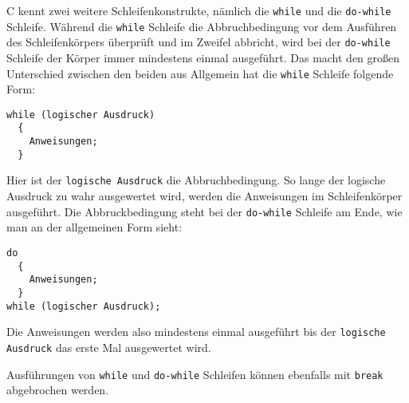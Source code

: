 C kennt zwei weitere Schleifenkonstrukte, nämlich die \verb|while| und die \verb|do-while| Schleife.
Während die \verb|while| Schleife die Abbruchbedingung vor dem Ausführen des Schleifenkörpers überprüft und im Zweifel abbricht, wird bei der \verb|do-while| Schleife der Körper immer mindestens einmal ausgeführt.
Das macht den großen Unterschied zwischen den beiden aus
Allgemein hat die \verb|while| Schleife folgende Form:
\begin{lstlisting}[caption={while Schleife}, belowcaptionskip=0.3em]
while (logischer Ausdruck)
  {
    Anweisungen;
  }
\end{lstlisting}
Hier ist der \texttt{logische Ausdruck} die Abbruchbedingung.
So lange der logische Ausdruck zu wahr ausgewertet wird, werden die Anweisungen im Schleifenkörper ausgeführt.
Die Abbruckbedingung steht bei der \verb|do-while| Schleife am Ende, wie man an der allgemeinen Form sieht:
\begin{lstlisting}[caption={do-while Schleife}, belowcaptionskip=0.3em]
do
  {
    Anweisungen;
  }
while (logischer Ausdruck);
\end{lstlisting}
Die Anweisungen werden also mindestens einmal ausgeführt bis der \texttt{logische Ausdruck} das erste Mal ausgewertet wird.

Ausführungen von \verb|while| und \verb|do-while| Schleifen können ebenfalls mit \verb|break| abgebrochen werden.
\endinput
